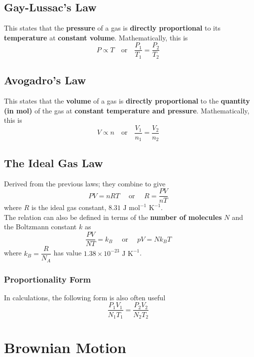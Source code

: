 \documentclass[a4paper,12pt]{article}
\let\oldsection\section
\renewcommand\section{\clearpage\oldsection}
\newcommand{\eqor}{\quad \text{or} \quad}
\newcommand{\lb}{\\[8pt]}
\begin{document}
\subsection{Gay-Lussac's Law}

This states that the \textbf{pressure} of a gas is \textbf{directly proportional} to its \textbf{temperature} at \textbf{constant volume}. Mathematically, this is
$$P \propto T  \eqor \frac{P_1}{T_1} = \frac{P_2}{T_2}$$

\subsection{Avogadro's Law}

This states that the \textbf{volume} of a gas is \textbf{directly proportional} to the \textbf{quantity (in mol)} of the gas at \textbf{constant temperature and pressure}. Mathematically, this is
$$V \propto n \eqor \frac{V_1}{n_1} = \frac{V_2}{n_2}$$

\pagebreak

\subsection{The Ideal Gas Law}
Derived from the previous laws; they combine to give
$$PV = nRT \quad \text{ or } \quad R = \frac{PV}{nT}$$
where $R$ is the ideal gas constant, $8.31 \text{ J mol}^{-1} \text{ K}^{-1}$.\lb
The relation can also be defined in terms of the \textbf{number of molecules} $N$ and the Boltzmann constant $k$ as
\begin{equation}\label{eq:ideal_gas}
  \frac{PV}{NT} = k_B \quad \text{ or } \quad pV = Nk_BT
\end{equation}
where $k_B = \dfrac{R}{N_A}$ has value $1.38 \times 10^{-23} \text{ J K}^{-1}$.

\subsubsection{Proportionality Form}
In calculations, the following form is also often useful
$$\frac{P_1V_1}{N_1T_1} = \frac{P_2V_2}{N_2T_2}$$

\section{Brownian Motion}
\end{document}
